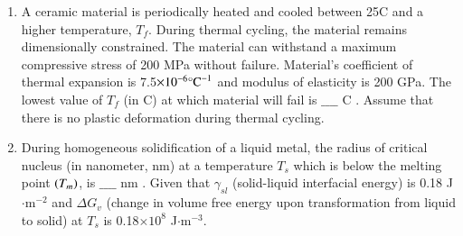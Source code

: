 \documentclass[journal]{IEEEtran}
\begin{document}
\begin{enumerate}
\item A ceramic material is periodically heated and cooled between 25\degree C and a higher temperature, $T_f$. During thermal cycling, the material remains dimensionally constrained. The material can withstand a maximum compressive stress of 200 MPa without failure. Material's coefficient of thermal expansion is 7.5$\times 10^{-6} \degree \text{C}^{-1}$ and modulus of elasticity  is 200 GPa. The lowest value of $T_f$ (in \degree C) at which material will fail is $\_\_\_\_$ \degree C . Assume that there is no plastic deformation during thermal cycling. \\
\item During homogeneous solidification of a liquid metal, the radius of critical nucleus (in nanometer, nm) at a temperature $T_s$ which is below the melting point $\left(T_m\right)$, is $\_\_\_\_$ nm . Given that $\gamma_{sl}$ (solid-liquid interfacial energy) is 0.18 J$\cdot\text{m}^{-2}$ and $\Delta G_v$ (change in volume free energy upon transformation from liquid to solid) at $T_s$ is 0.18$\times 10^{8}$ J$\cdot\text{m}^{-3}$. \\
			 \end{enumerate}
			 
\end{document}

